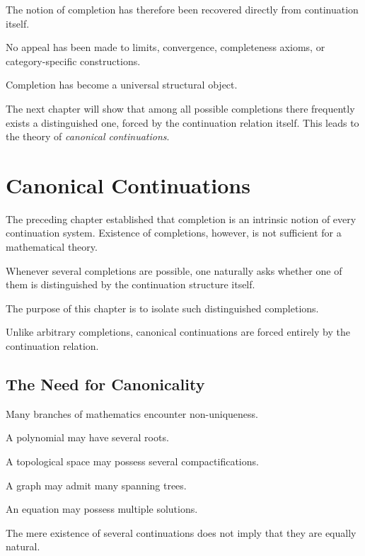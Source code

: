 \documentclass[13pt,openany]{book}
\theoremstyle{plain}
\theoremstyle{definition}
\begin{document}
The notion of completion has therefore been recovered directly from continuation
itself.

No appeal has been made to limits, convergence, completeness axioms, or
category-specific constructions.

Completion has become a universal structural object.

The next chapter will show that among all possible completions there frequently
exists a distinguished one, forced by the continuation relation itself. This
leads to the theory of \emph{canonical continuations}.

\chapter{Canonical Continuations}

The preceding chapter established that completion is an intrinsic notion of every
continuation system. Existence of completions, however, is not sufficient for a
mathematical theory.

Whenever several completions are possible, one naturally asks whether one of
them is distinguished by the continuation structure itself.

The purpose of this chapter is to isolate such distinguished completions.

Unlike arbitrary completions, canonical continuations are forced entirely by the
continuation relation.


\section{The Need for Canonicality}

Many branches of mathematics encounter non-uniqueness.

A polynomial may have several roots.

A topological space may possess several compactifications.

A graph may admit many spanning trees.

An equation may possess multiple solutions.

The mere existence of several continuations does not imply that they are equally
natural.
\end{document}
